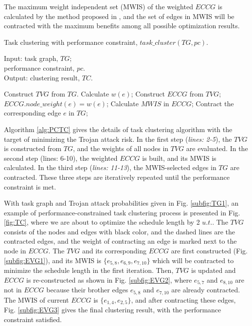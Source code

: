 \documentclass[10pt,journal]{IEEEtran}
\begin{document}

The maximum weight independent set (MWIS) of the weighted $ECCG$ is calculated by the method proposed in \cite{conference:LC}, and the set of edges in MWIS will be contracted with the maximum benefits among all possible optimization results.

\begin{algorithm}[!h]
\caption{Task clustering with performance constraint, $task\_cluster(TG, pc)$.}
\label{alg:PCTC}
{Input:}
task graph, $TG$;\\
\hspace*{2.8em}performance constraint, $pc$.\\
{Output:} clustering result, $TC$.
\begin{algorithmic}[1]
\STATE Construct $TVG$ from $TG$.
\STATE Calculate $w(e)$;
\ENDFOR
\STATE Construct $ECCG$ from $TVG$;
\STATE $ECCG.node\_weight(e)=w(e)$;
\ENDFOR
\STATE Calculate $MWIS$ in $ECCG$;
    \STATE Contract the corresponding edge $e$ in $TG$;
\ENDFOR
\ENDWHILE
\end{algorithmic}
\end{algorithm}


Algorithm \ref{alg:PCTC} gives the details of task clustering algorithm with the target of minimizing the Trojan attack risk. In the first step (\textit{lines: 2-5}), the $TVG$ is constructed from $TG$, and the weights of all nodes in $TVG$ are evaluated. In the second step (lines: 6-10), the weighted $ECCG$ is built, and its MWIS is calculated. In the third step (\textit{lines: 11-13}), the MWIS-selected edges in $TG$ are contracted. These three steps are iteratively repeated until the performance constraint is met.

With task graph and Trojan attack probabilities given in Fig. \ref{subfig:TG1}, an example of performance-constrained task clustering process is presented in Fig. \ref{fig:TC}, where we are about to optimize the schedule length by 2 $u.t.$. The $TVG$ consists of the nodes and edges with black color, and the dashed lines are the contracted edges, and the weight of contracting an edge is marked next to the node in $ECCG$. The $TVG$ and its corresponding $ECCG$ are first constructed (Fig. \ref{subfig:EVG1}), and its MWIS is $\{e_{5,8}, e_{6,9}, e_{7,10}\}$ which will be contracted to minimize the schedule length in the first iteration. Then, $TVG$ is updated and $ECCG$ is re-constructed as shown in Fig. \ref{subfig:EVG2}, where $e_{5,7}$ and $e_{8,10}$ are not in $ECCG$ because their brother edges $e_{5,8}$ and $e_{7,10}$ are already contracted. The MWIS of current $ECCG$ is $\{e_{1,4}, e_{2,5}\}$, and after contracting these edges, Fig. \ref{subfig:EVG3} gives the final clustering result, with the performance constraint satisfied.%
\end{document}
